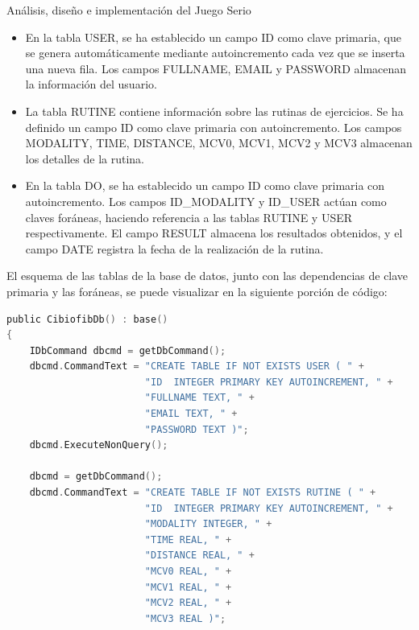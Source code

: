 \begin{thesischapter}{2} {Análisis, diseño e implementación del Juego Serio}
    \vspace{10pt}
    \begin{itemize}
        \item En la tabla USER, se ha establecido un campo ID como clave primaria, que se genera automáticamente mediante autoincremento 
        cada vez que se inserta una nueva fila. Los campos FULLNAME, EMAIL y PASSWORD almacenan la información del usuario.
    
        \item La tabla RUTINE contiene información sobre las rutinas de ejercicios. Se ha definido un campo ID como clave primaria con 
        autoincremento. Los campos MODALITY, TIME, DISTANCE, MCV0, MCV1, MCV2 y MCV3 almacenan los detalles de la rutina.
    
        \item En la tabla DO, se ha establecido un campo ID como clave primaria con autoincremento. Los campos ID\_MODALITY y ID\_USER actúan 
        como claves foráneas, haciendo referencia a las tablas RUTINE y USER respectivamente. El campo RESULT almacena los resultados obtenidos, 
        y el campo DATE registra la fecha de la realización de la rutina.
        
    \end{itemize}

    El esquema de las tablas de la base de datos, junto con las dependencias de clave primaria y las foráneas, se puede visualizar en la siguiente 
    porción de código:

\begin{center}
\begin{minipage}{0.8\textwidth}
\begin{lstlisting}[language=c,caption={Sección de código, constructor de la clase CibiofibDb}, label={code: database-code}]
public CibiofibDb() : base()
{
    IDbCommand dbcmd = getDbCommand();
    dbcmd.CommandText = "CREATE TABLE IF NOT EXISTS USER ( " +
                        "ID  INTEGER PRIMARY KEY AUTOINCREMENT, " +
                        "FULLNAME TEXT, " +
                        "EMAIL TEXT, " +
                        "PASSWORD TEXT )";
    dbcmd.ExecuteNonQuery();

    dbcmd = getDbCommand();
    dbcmd.CommandText = "CREATE TABLE IF NOT EXISTS RUTINE ( " +
                        "ID  INTEGER PRIMARY KEY AUTOINCREMENT, " +
                        "MODALITY INTEGER, " +
                        "TIME REAL, " +
                        "DISTANCE REAL, " +
                        "MCV0 REAL, " +
                        "MCV1 REAL, " +
                        "MCV2 REAL, " +
                        "MCV3 REAL )";


\end{lstlisting}
\end{minipage}
\end{center}
\end{thesischapter}
